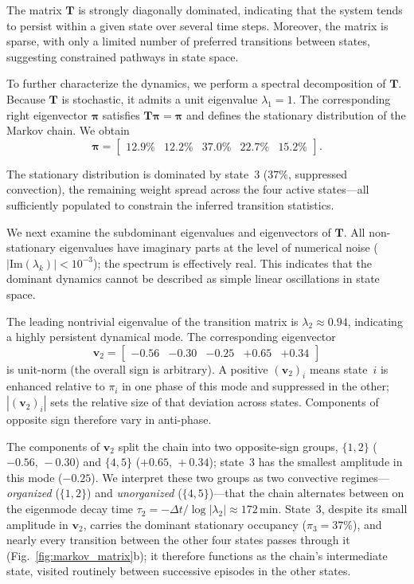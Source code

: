 \documentclass[
    aps,
    prl,
    reprint,
    superscriptaddress,
    amsmath,amssymb,
    floatfix,
    nofootinbib
]{revtex4-2}
\begin{document}
The matrix $\mathbf{T}$ is strongly diagonally dominated, indicating that the system tends to persist within a given state over several time steps. Moreover, the matrix is sparse, with only a limited number of preferred transitions between states, suggesting constrained pathways in state space.

To further characterize the dynamics, we perform a spectral decomposition of $\mathbf{T}$. Because $\mathbf{T}$ is stochastic, it admits a unit eigenvalue $\lambda_1=1$. The corresponding right eigenvector $\boldsymbol{\pi}$ satisfies $\mathbf{T}\boldsymbol{\pi}=\boldsymbol{\pi}$ and defines the stationary distribution of the Markov chain. We obtain
\begin{equation}
\boldsymbol{\pi} =
\begin{bmatrix}
12.9\% & 12.2\% & 37.0\% & 22.7\% & 15.2\%
\end{bmatrix}.
\label{eq:canon}
\end{equation}

The stationary distribution is dominated by state~3 ($37\%$, suppressed convection), the remaining weight spread across the four active states---all sufficiently populated to constrain the inferred transition statistics.

We next examine the subdominant eigenvalues and eigenvectors of $\mathbf{T}$. All non-stationary eigenvalues have imaginary parts at the level of numerical noise ($|\mathrm{Im}(\lambda_k)|<10^{-3}$); the spectrum is effectively real. This indicates that the dominant dynamics cannot be described as simple linear oscillations in state space.

The leading nontrivial eigenvalue of the transition matrix is $\lambda_2 \approx 0.94$, indicating a highly persistent dynamical mode. The corresponding eigenvector
\begin{equation}
\mathbf{v}_2 =
\begin{bmatrix}
-0.56 & -0.30 & -0.25 & +0.65 & +0.34
\end{bmatrix}
\end{equation}
is unit-norm (the overall sign is arbitrary). A positive $(\mathbf{v}_2)_i$ means state~$i$ is enhanced relative to $\pi_i$ in one phase of this mode and suppressed in the other; $|(\mathbf{v}_2)_i|$ sets the relative size of that deviation across states. Components of opposite sign therefore vary in anti-phase.

The components of $\mathbf{v}_2$ split the chain into two opposite-sign groups, $\{1,2\}$ ($-0.56,\,-0.30$) and $\{4,5\}$ ($+0.65,\,+0.34$); state~3 has the smallest amplitude in this mode ($-0.25$). We interpret these two groups as two convective regimes---\emph{organized} ($\{1,2\}$) and \emph{unorganized} ($\{4,5\}$)---that the chain alternates between on the eigenmode decay time $\tau_2 = -\Delta t / \log|\lambda_2| \approx 172\,\mathrm{min}$. State~3, despite its small amplitude in $\mathbf{v}_2$, carries the dominant stationary occupancy ($\pi_3=37\%$), and nearly every transition between the other four states passes through it (Fig.~\ref{fig:markov_matrix}b); it therefore functions as the chain's intermediate state, visited routinely between successive episodes in the other states.
\end{document}
